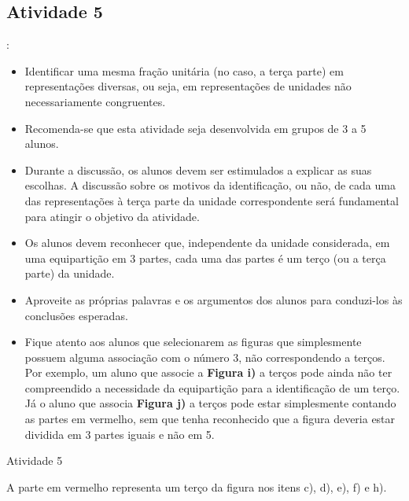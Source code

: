 \subsection{Atividade 5}
  \vspace{.1cm}:

\begin{itemize} %
    \item       Identificar uma mesma fração unitária (no caso, a terça parte) em representações diversas, ou seja, em representações de unidades não necessariamente congruentes.
\end{itemize} %

 \vspace{.1cm}

   \vspace{.1cm}
\begin{itemize} %
    \item       Recomenda-se que esta atividade seja desenvolvida em grupos de 3 a 5 alunos.
    \item       Durante a discussão, os alunos devem ser estimulados a explicar as suas escolhas. A discussão sobre os motivos da identificação, ou não, de cada uma das representações à terça parte da unidade correspondente será fundamental para atingir o objetivo da atividade.
    \item       Os alunos devem reconhecer que, independente da unidade considerada, em uma equipartição em 3 partes, cada uma das partes é um terço (ou a terça parte) da unidade.
    \item       Aproveite as próprias palavras e os argumentos dos alunos para conduzi-los às conclusões esperadas.
    \item       Fique atento aos alunos que selecionarem as figuras que simplesmente possuem alguma associação com o número 3, não correspondendo a terços. Por exemplo, um aluno que associe a       {\bf Figura i)} a terços pode ainda não ter compreendido a necessidade da equipartição para a identificação de um terço. Já o aluno que associa       {\bf Figura j)}       a terços pode estar simplesmente contando as partes em vermelho, sem que tenha reconhecido que a figura deveria estar dividida em 3 partes iguais e não em 5.
\end{itemize} %

\begin{resposta*}{Atividade 5}

A parte em vermelho representa um terço da figura nos itens c), d), e), f) e h).
\end{resposta*}

